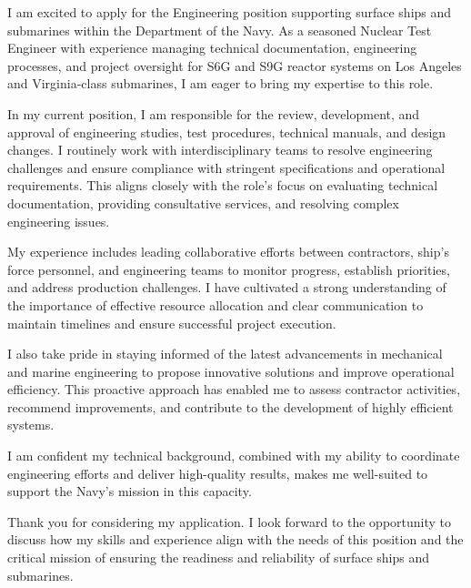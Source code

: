 I am excited to apply for the Engineering position supporting surface ships and submarines within the Department of the Navy.
As a seasoned Nuclear Test Engineer with experience managing technical documentation, engineering processes, and project oversight for S6G and S9G reactor systems on Los Angeles and Virginia-class submarines, I am eager to bring my expertise to this role.

In my current position, I am responsible for the review, development, and approval of engineering studies, test procedures, technical manuals, and design changes.
I routinely work with interdisciplinary teams to resolve engineering challenges and ensure compliance with stringent specifications and operational requirements.
This aligns closely with the role’s focus on evaluating technical documentation, providing consultative services, and resolving complex engineering issues.

My experience includes leading collaborative efforts between contractors, ship’s force personnel, and engineering teams to monitor progress, establish priorities, and address production challenges.
I have cultivated a strong understanding of the importance of effective resource allocation and clear communication to maintain timelines and ensure successful project execution.

I also take pride in staying informed of the latest advancements in mechanical and marine engineering to propose innovative solutions and improve operational efficiency.
This proactive approach has enabled me to assess contractor activities, recommend improvements, and contribute to the development of highly efficient systems.

I am confident my technical background, combined with my ability to coordinate engineering efforts and deliver high-quality results, makes me well-suited to support the Navy's mission in this capacity.

Thank you for considering my application.
I look forward to the opportunity to discuss how my skills and experience align with the needs of this position and the critical mission of ensuring the readiness and reliability of surface ships and submarines.

